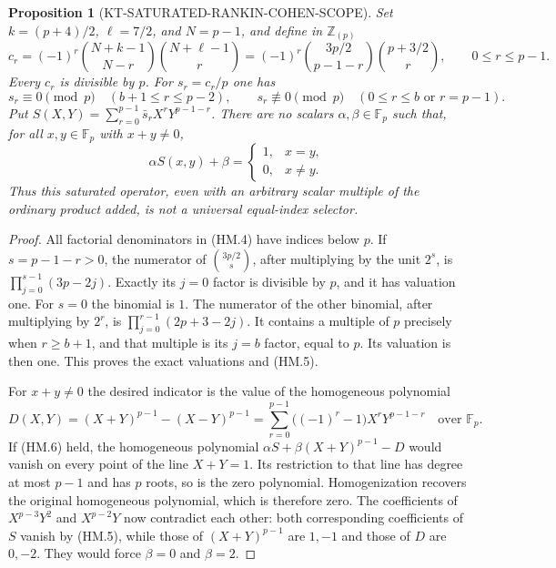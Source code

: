 \documentclass[11pt,a4paper]{article}
\newtheorem{proposition}[theorem]{Proposition}
\theoremstyle{definition}
\begin{document}
\begin{proposition}[KT-SATURATED-RANKIN-COHEN-SCOPE]
Set $k=(p+4)/2$, $\ell=7/2$, and $N=p-1$, and define in
$\mathbb Z_{(p)}$
\[
 c_r=(-1)^r\binom{N+k-1}{N-r}\binom{N+\ell-1}{r}
     =(-1)^r\binom{3p/2}{p-1-r}\binom{p+3/2}{r},
 \qquad 0\le r\le p-1.
 \tag{HM.4}
\]
Every $c_r$ is divisible by $p$.  For $s_r=c_r/p$ one has
\[
 s_r\equiv0\pmod p\quad(b+1\le r\le p-2),
 \qquad
 s_r\not\equiv0\pmod p\quad(0\le r\le b\text{ or }r=p-1).
 \tag{HM.5}
\]
Put $S(X,Y)=\sum_{r=0}^{p-1}\bar s_rX^rY^{p-1-r}$.
There are no scalars $\alpha,\beta\in\mathbb F_p$ such that, for all
$x,y\in\mathbb F_p$ with $x+y\ne0$,
\[
 \alpha S(x,y)+\beta=\begin{cases}1,&x=y,\\0,&x\ne y.\end{cases}
 \tag{HM.6}
\]
Thus this saturated operator, even with an arbitrary scalar multiple
of the ordinary product added, is not a universal equal-index selector.
\end{proposition}

\begin{proof}
All factorial denominators in (HM.4) have indices below $p$.
If $s=p-1-r>0$, the numerator of $\binom{3p/2}{s}$, after multiplying
by the unit $2^s$, is
$\prod_{j=0}^{s-1}(3p-2j)$.  Exactly its $j=0$ factor is divisible by
$p$, and it has valuation one.  For $s=0$ the binomial is $1$.
The numerator of the other binomial, after multiplying by $2^r$, is
$\prod_{j=0}^{r-1}(2p+3-2j)$.  It contains a multiple of $p$ precisely
when $r\ge b+1$, and that multiple is its $j=b$ factor, equal to $p$.
Its valuation is then one.  This proves the exact valuations and (HM.5).

For $x+y\ne0$ the desired indicator is the value of the homogeneous
polynomial
\[
 D(X,Y)=(X+Y)^{p-1}-(X-Y)^{p-1}
       =\sum_{r=0}^{p-1}\bigl((-1)^r-1\bigr)X^rY^{p-1-r}
       \quad\text{over }\mathbb F_p.
 \tag{HM.7}
\]
If (HM.6) held, the homogeneous polynomial
$\alpha S+\beta(X+Y)^{p-1}-D$ would vanish on every point of the line
$X+Y=1$.  Its restriction to that line has degree at most $p-1$ and
has $p$ roots, so is the zero polynomial.  Homogenization recovers the
original homogeneous polynomial, which is therefore zero.
The coefficients of $X^{p-3}Y^2$ and $X^{p-2}Y$ now contradict each
other: both corresponding coefficients of $S$ vanish by (HM.5), while
those of $(X+Y)^{p-1}$ are $1,-1$ and those of $D$ are $0,-2$.
They would force $\beta=0$ and $\beta=2$.
\end{proof}
\end{document}
